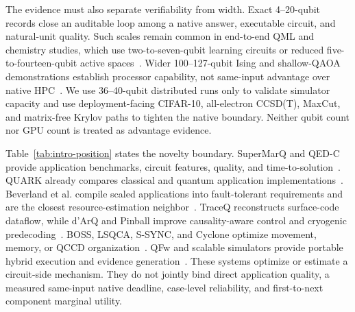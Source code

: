 The evidence must also separate verifiability from width. Exact 4--20-qubit records close an auditable loop among a native answer, executable circuit, and natural-unit quality. Such scales remain common in end-to-end QML and chemistry studies, which use two-to-seven-qubit learning circuits or reduced five-to-fourteen-qubit active spaces~\cite{yang2023endtoendqml,domingo2024temporalqml,weaving2025nitrogen}. Wider 100--127-qubit Ising and shallow-QAOA demonstrations establish processor capability, not same-input advantage over native HPC~\cite{kim2023utility,pelofske2024shortqaoa}. We use 36--40-qubit distributed runs only to validate simulator capacity and use deployment-facing CIFAR-10, all-electron CCSD(T), MaxCut, and matrix-free Krylov paths to tighten the native boundary. Neither qubit count nor GPU count is treated as advantage evidence.

Table~\ref{tab:intro-position} states the novelty boundary. SuperMarQ and QED-C provide application benchmarks, circuit features, quality, and time-to-solution~\cite{supermarq,qedcbench}. QUARK already compares classical and quantum application implementations~\cite{quark2022}. Beverland et al. compile scaled applications into fault-tolerant requirements and are the closest resource-estimation neighbor~\cite{beverland2022}. TraceQ reconstructs surface-code dataflow, while d'ArQ and Pinball improve causality-aware control and cryogenic predecoding~\cite{traceq2026,darq2026,pinball2026}. BOSS, LSQCA, S-SYNC, and Cyclone optimize movement, memory, or QCCD organization~\cite{boss2025,lsqca2025,ssync2025,cyclone2026}. QFw and scalable simulators provide portable hybrid execution and evidence generation~\cite{qfw2025,scaleqsim}. These systems optimize or estimate a circuit-side mechanism. They do not jointly bind direct application quality, a measured same-input native deadline, case-level reliability, and first-to-next component marginal utility.

